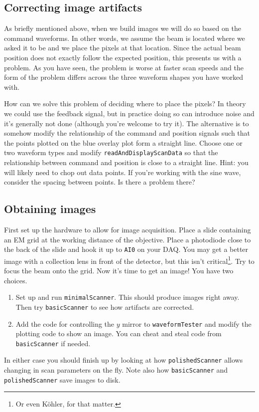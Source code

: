 \documentclass[a4paper]{report}
\begin{document}
\subsection{Correcting image artifacts}
As briefly mentioned above, when we build images we will do so based on the command waveforms. 
In other words, we assume the beam is located where we asked it to be and we place the pixels at that location.
Since the actual beam position does not exactly follow the expected position, this presents us with a problem. 
As you have seen, the problem is worse at faster scan speeds and the form of the problem differs across the three waveform shapes you have worked with.

How can we solve this problem of deciding where to place the pixels?
In theory we could use the feedback signal, but in practice doing so can introduce noise and it's generally not done (although you're welcome to try it). 
The alternative is to somehow modify the relationship of the command and position signals such that the points plotted on the blue overlay plot form a straight line.
Choose one or two waveform types and modify \texttt{readAndDisplayScanData} so that the relationship between command and position is close to a straight line. 
Hint: you will likely need to chop out data points. 
If you're working with the sine wave, consider the spacing between points. 
Is there a problem there?


\subsection{Obtaining images}
First set up the hardware to allow for image acquisition.
Place a slide containing an EM grid at the working distance of the objective. 
Place a photodiode close to the back of the slide and hook it up to \texttt{AI0} on your DAQ. 
You may get a better image with a collection lens in front of the detector, but this isn't critical\footnote{Or even K\"{o}hler, for that matter.}.
Try to focus the beam onto the grid.
Now it's time to get an image!
You have two choices.
\begin{enumerate}
    \item Set up and run \texttt{minimalScanner}. This should produce images right away. Then try \texttt{basicScanner} to see how artifacts are corrected.
    \item Add the code for controlling the $y$ mirror to \texttt{waveformTester} and modify the plotting code to show an image. 
    You can cheat and steal code from \texttt{basicScanner} if needed. 
\end{enumerate}

In either case you should finish up by looking at how \texttt{polishedScanner} allows changing in scan parameters on the fly. 
Note also how \texttt{basicScanner} and \texttt{polishedScanner} save images to disk.
\end{document}
